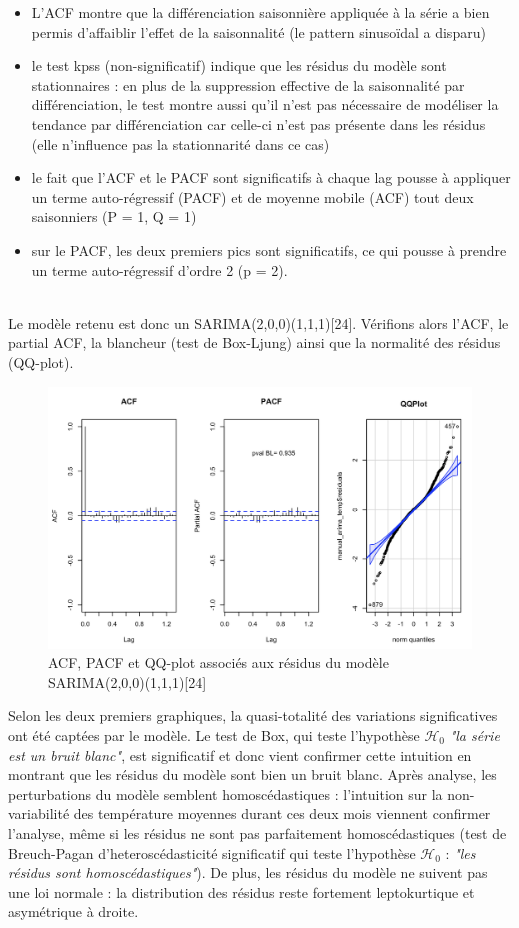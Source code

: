 \documentclass{article}
\theoremstyle{definition}
\theoremstyle{remark}
\begin{document}
\begin{minipage}{.5\textwidth}
    \begin{itemize}
        \item L'ACF montre que la différenciation saisonnière appliquée à la série a bien permis d'affaiblir l'effet de la saisonnalité (le pattern sinusoïdal a disparu)
        \item le test kpss (non-significatif) indique que les résidus du modèle sont stationnaires : en plus de la suppression effective de la saisonnalité par différenciation, le test montre aussi qu'il n'est pas nécessaire de modéliser la tendance par différenciation car celle-ci n'est pas présente dans les résidus (elle n'influence pas la stationnarité dans ce cas)
        \item le fait que l'ACF et le PACF sont significatifs à chaque lag pousse à appliquer un terme auto-régressif (PACF) et de moyenne mobile (ACF) tout deux saisonniers (P = 1, Q = 1)
        \item sur le PACF, les deux premiers pics sont significatifs, ce qui pousse à prendre un terme auto-régressif d'ordre 2 (p = 2).
    \end{itemize}
\end{minipage}
\newline
\\
Le modèle retenu est donc un SARIMA(2,0,0)(1,1,1)[24].\newline
Vérifions alors l'ACF, le partial ACF, la blancheur (test de Box-Ljung) ainsi que la normalité des résidus (QQ-plot).
\FloatBarrier
\begin{figure}[!h]
    \centering
    \includegraphics[width=0.6\linewidth]{fig5.png}
    \caption{ACF, PACF et QQ-plot associés aux résidus du modèle SARIMA(2,0,0)(1,1,1)[24]}
    \label{fig:enter-label}
\end{figure}
Selon les deux premiers graphiques, la quasi-totalité des variations significatives ont été captées par le modèle. Le test de Box, qui teste l'hypothèse $\mathcal{H}_0$ \textit{"la série est un bruit blanc"}, est significatif et donc vient confirmer cette intuition en montrant que les résidus du modèle sont bien un bruit blanc.\newline
Après analyse, les perturbations du modèle semblent homoscédastiques : l'intuition sur la non-variabilité des température moyennes durant ces deux mois viennent confirmer l'analyse, même si les résidus ne sont pas parfaitement homoscédastiques (test de Breuch-Pagan d'heteroscédasticité significatif qui teste l'hypothèse $\mathcal{H}_0$ : \textit{"les résidus sont homoscédastiques"}). De plus, les résidus du modèle ne suivent pas une loi normale : la distribution des résidus reste fortement leptokurtique et asymétrique à droite. 
\end{document}
